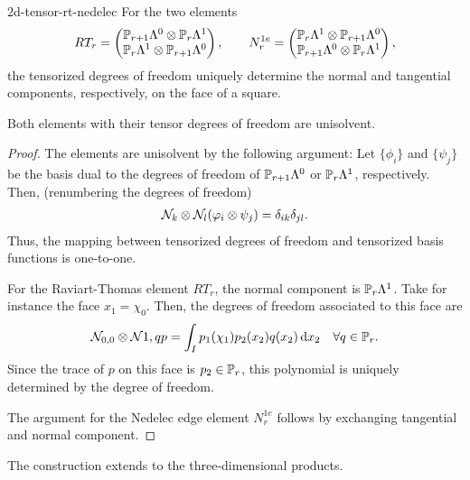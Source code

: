 \begin{Lemma}{2d-tensor-rt-nedelec}
  For the two elements
  \begin{gather}
    RT_r =
    \begin{pmatrix}
      \P_{r+1}\Lambda^0 \otimes \P_{r}\Lambda^1\\
      \P_{r}\Lambda^1 \otimes \P_{r+1}\Lambda^0
    \end{pmatrix},
    \qquad
    N^{1e}_r =
    \begin{pmatrix}
      \P_{r}\Lambda^1 \otimes \P_{r+1}\Lambda^0\\
      \P_{r+1}\Lambda^0 \otimes \P_{r}\Lambda^1      
    \end{pmatrix},
  \end{gather}
  the tensorized degrees of freedom uniquely determine the normal and
  tangential components, respectively, on the face of a square.

  Both elements with their tensor degrees of freedom are unisolvent.
\end{Lemma}

\begin{proof}
  The elements are unisolvent by the following argument: Let
  $\{\phi_i\}$ and $\{\psi_j\}$ be the basis dual to the degrees of
  freedom of $\P_{r+1}\Lambda^0$ or $\P_r \Lambda^1$,
  respectively. Then, (renumbering the degrees of freedom)
  \begin{gather*}
    \nodal_k\otimes\nodal_l(\phi_i\otimes\psi_j) = \delta_{ik}\delta_{jl}.
  \end{gather*}
  Thus, the mapping between tensorized degrees of freedom and
  tensorized basis functions is one-to-one.

  For the Raviart-Thomas element $RT_r$, the normal component is
  $\P_r\Lambda^1$. Take for instance the face $x_1 = \chi_0$. Then,
  the degrees of freedom associated to this face are
  \begin{gather*}
    \nodal_{0,0} \otimes \nodal{1,q} p
    = \int_I p_1(\chi_1) p_2(x_2) q(x_2) \dx_2
    \quad\forall q\in \P_r.
  \end{gather*}
  Since the trace of $p$ on this face is $p_2 \in \P_r$, this
  polynomial is uniquely determined by the degree of freedom.

  The argument for the Nedelec edge element $N^{1e}_r$ follows by
  exchanging tangential and normal component.
\end{proof}

\begin{remark}
  The construction extends to the three-dimensional products.
\end{remark}



